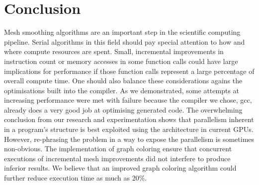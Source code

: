 \documentclass[a4paper,11pt, twocolumn]{article}
\begin{document}
\section{Conclusion}
Mesh smoothing algorithms are an important step in the scientific computing pipeline.  Serial algorithms in this field  should pay special attention to how and where compute resources are spent.  Small, incremental improvements in instruction count or memory accesses in some function calls could have large implications for performance if those function calls represent a large percentage of overall compute time.  One should also balance these considerations agains the optimisations built into the compiler.  As we demonstrated, some attempts at increasing performance were met with failure because the compiler we chose, gcc, already does a very good job at optimising generated code.  The overwhelming conclusion from our research and experimentation shows that parallelism inherent in a program's structure is best exploited using the architecture in current GPUs.  However, re-phrasing the problem in a way to expose the parallelism is sometimes non-obvious.  The implementation of graph coloring ensure that concurrent executions of incremental mesh improvements did not interfere to produce inferior results.  We believe that an improved graph coloring algorithm could further reduce execution time as much as 20\%.

\end{document}
